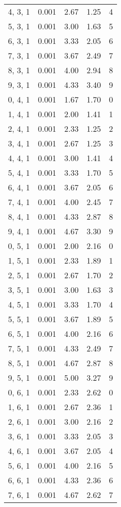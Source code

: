 \documentclass[12pt]{article}
\begin{document}
\begin{tabular}{c || c || c | c | c}
4, 3, 1 & 0.001 & 2.67 & 1.25 & 4 \\
5, 3, 1 & 0.001 & 3.00 & 1.63 & 5 \\
6, 3, 1 & 0.001 & 3.33 & 2.05 & 6 \\
7, 3, 1 & 0.001 & 3.67 & 2.49 & 7 \\
8, 3, 1 & 0.001 & 4.00 & 2.94 & 8 \\
9, 3, 1 & 0.001 & 4.33 & 3.40 & 9 \\
0, 4, 1 & 0.001 & 1.67 & 1.70 & 0 \\
1, 4, 1 & 0.001 & 2.00 & 1.41 & 1 \\
2, 4, 1 & 0.001 & 2.33 & 1.25 & 2 \\
3, 4, 1 & 0.001 & 2.67 & 1.25 & 3 \\
4, 4, 1 & 0.001 & 3.00 & 1.41 & 4 \\
5, 4, 1 & 0.001 & 3.33 & 1.70 & 5 \\
6, 4, 1 & 0.001 & 3.67 & 2.05 & 6 \\
7, 4, 1 & 0.001 & 4.00 & 2.45 & 7 \\
8, 4, 1 & 0.001 & 4.33 & 2.87 & 8 \\
9, 4, 1 & 0.001 & 4.67 & 3.30 & 9 \\
0, 5, 1 & 0.001 & 2.00 & 2.16 & 0 \\
1, 5, 1 & 0.001 & 2.33 & 1.89 & 1 \\
2, 5, 1 & 0.001 & 2.67 & 1.70 & 2 \\
3, 5, 1 & 0.001 & 3.00 & 1.63 & 3 \\
4, 5, 1 & 0.001 & 3.33 & 1.70 & 4 \\
5, 5, 1 & 0.001 & 3.67 & 1.89 & 5 \\
6, 5, 1 & 0.001 & 4.00 & 2.16 & 6 \\
7, 5, 1 & 0.001 & 4.33 & 2.49 & 7 \\
8, 5, 1 & 0.001 & 4.67 & 2.87 & 8 \\
9, 5, 1 & 0.001 & 5.00 & 3.27 & 9 \\
0, 6, 1 & 0.001 & 2.33 & 2.62 & 0 \\
1, 6, 1 & 0.001 & 2.67 & 2.36 & 1 \\
2, 6, 1 & 0.001 & 3.00 & 2.16 & 2 \\
3, 6, 1 & 0.001 & 3.33 & 2.05 & 3 \\
4, 6, 1 & 0.001 & 3.67 & 2.05 & 4 \\
5, 6, 1 & 0.001 & 4.00 & 2.16 & 5 \\
6, 6, 1 & 0.001 & 4.33 & 2.36 & 6 \\
7, 6, 1 & 0.001 & 4.67 & 2.62 & 7 \\

\end{tabular}
\end{document}
